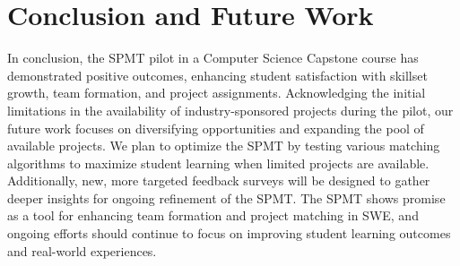 \section{Conclusion and Future Work}


In conclusion, the SPMT pilot in a Computer Science Capstone course has demonstrated positive outcomes, enhancing student satisfaction with skillset growth, team formation, and project assignments. Acknowledging the initial limitations in the availability of industry-sponsored projects during the pilot, our future work focuses on diversifying opportunities and expanding the pool of available projects. We plan to optimize the SPMT by testing various matching algorithms to maximize student learning when limited projects are available. Additionally, new, more targeted feedback surveys will be designed to gather deeper insights for ongoing refinement of the SPMT. 
The SPMT shows promise as a tool for enhancing team formation and project matching in SWE, and ongoing efforts should continue to focus on improving student learning outcomes and real-world experiences.